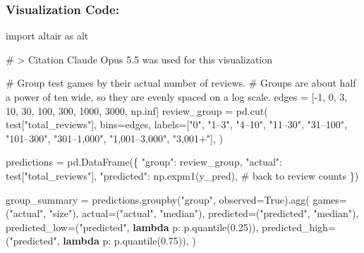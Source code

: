 \documentclass[
  letterpaper,
  DIV=11,
  numbers=noendperiod]{scrartcl}
\newenvironment{Shaded}{\begin{snugshade}}{\end{snugshade}}
\newcommand{\CommentTok}[1]{\textcolor[rgb]{0.37,0.37,0.37}{#1}}
\newcommand{\DecValTok}[1]{\textcolor[rgb]{0.68,0.00,0.00}{#1}}
\newcommand{\FloatTok}[1]{\textcolor[rgb]{0.68,0.00,0.00}{#1}}
\newcommand{\ImportTok}[1]{\textcolor[rgb]{0.00,0.46,0.62}{#1}}
\newcommand{\KeywordTok}[1]{\textcolor[rgb]{0.00,0.23,0.31}{\textbf{#1}}}
\newcommand{\NormalTok}[1]{\textcolor[rgb]{0.00,0.23,0.31}{#1}}
\newcommand{\OperatorTok}[1]{\textcolor[rgb]{0.37,0.37,0.37}{#1}}
\newcommand{\StringTok}[1]{\textcolor[rgb]{0.13,0.47,0.30}{#1}}
\newcommand{\VariableTok}[1]{\textcolor[rgb]{0.07,0.07,0.07}{#1}}
\begin{document}
\subsubsection{Visualization Code:}\label{visualization-code}

\begin{Shaded}
\begin{Highlighting}[]
\ImportTok{import}\NormalTok{ altair }\ImportTok{as}\NormalTok{ alt}

\CommentTok{\# \textgreater{} Citation Claude Opus 5.5 was used for this visualization}

\CommentTok{\# Group test games by their actual number of reviews.}
\CommentTok{\# Groups are about half a power of ten wide, so they are evenly spaced on a log scale.}
\NormalTok{edges }\OperatorTok{=}\NormalTok{ [}\OperatorTok{{-}}\DecValTok{1}\NormalTok{, }\DecValTok{0}\NormalTok{, }\DecValTok{3}\NormalTok{, }\DecValTok{10}\NormalTok{, }\DecValTok{30}\NormalTok{, }\DecValTok{100}\NormalTok{, }\DecValTok{300}\NormalTok{, }\DecValTok{1000}\NormalTok{, }\DecValTok{3000}\NormalTok{, np.inf]}
\NormalTok{review\_group }\OperatorTok{=}\NormalTok{ pd.cut(}
\NormalTok{    test[}\StringTok{"total\_reviews"}\NormalTok{],}
\NormalTok{    bins}\OperatorTok{=}\NormalTok{edges,}
\NormalTok{    labels}\OperatorTok{=}\NormalTok{[}\StringTok{"0"}\NormalTok{, }\StringTok{"1–3"}\NormalTok{, }\StringTok{"4–10"}\NormalTok{, }\StringTok{"11–30"}\NormalTok{, }\StringTok{"31–100"}\NormalTok{, }\StringTok{"101–300"}\NormalTok{, }\StringTok{"301–1,000"}\NormalTok{, }\StringTok{"1,001–3,000"}\NormalTok{, }\StringTok{"3,001+"}\NormalTok{],}
\NormalTok{)}

\NormalTok{predictions }\OperatorTok{=}\NormalTok{ pd.DataFrame(\{}
    \StringTok{"group"}\NormalTok{: review\_group,}
    \StringTok{"actual"}\NormalTok{: test[}\StringTok{"total\_reviews"}\NormalTok{],}
    \StringTok{"predicted"}\NormalTok{: np.expm1(y\_pred),  }\CommentTok{\# back to review counts}
\NormalTok{\})}

\NormalTok{group\_summary }\OperatorTok{=}\NormalTok{ predictions.groupby(}\StringTok{"group"}\NormalTok{, observed}\OperatorTok{=}\VariableTok{True}\NormalTok{).agg(}
\NormalTok{    games}\OperatorTok{=}\NormalTok{(}\StringTok{"actual"}\NormalTok{, }\StringTok{"size"}\NormalTok{),}
\NormalTok{    actual}\OperatorTok{=}\NormalTok{(}\StringTok{"actual"}\NormalTok{, }\StringTok{"median"}\NormalTok{),}
\NormalTok{    predicted}\OperatorTok{=}\NormalTok{(}\StringTok{"predicted"}\NormalTok{, }\StringTok{"median"}\NormalTok{),}
\NormalTok{    predicted\_low}\OperatorTok{=}\NormalTok{(}\StringTok{"predicted"}\NormalTok{, }\KeywordTok{lambda}\NormalTok{ p: p.quantile(}\FloatTok{0.25}\NormalTok{)),}
\NormalTok{    predicted\_high}\OperatorTok{=}\NormalTok{(}\StringTok{"predicted"}\NormalTok{, }\KeywordTok{lambda}\NormalTok{ p: p.quantile(}\FloatTok{0.75}\NormalTok{)),}
\NormalTok{)}


\end{Highlighting}
\end{Shaded}
\end{document}
